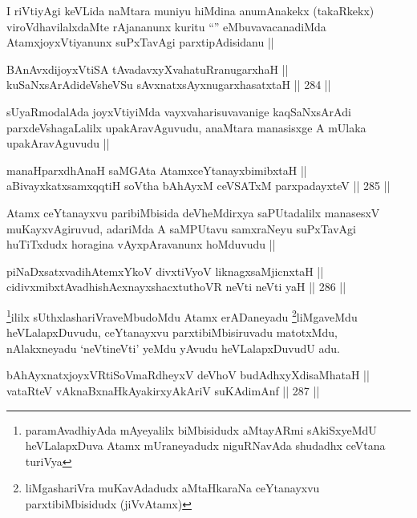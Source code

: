 \begin{artha}
I riVtiyAgi keVLida naMtara muniyu hiMdina anumAnakekx (takaRkekx) viroVdhavilalxdaMte rAjananunx kuritu ``\stext'' eMbuvavacanadiMda AtamxjoyxVtiyanunx suPxTavAgi parxtipAdisidanu ||
\end{artha}


\begin{shl}
BAnAvxdijoyxVtiSA tAvadavxyXvahatuRranugarxhaH || \\
kuSaNxsArAdideVsheVSu sAvxnatxsAyxnugarxhasatxtaH ||  284 ||  
\end{shl}

\begin{artha}
sUyaRmodalAda joyxVtiyiMda vayxvaharisuvavanige kaqSaNxsArAdi parxdeVshagaLalilx upakAravAguvudu, anaMtara manasisxge A mUlaka upakAravAguvudu ||
\end{artha}

\begin{shl}
manaHparxdhAnaH saMGAta AtamxceYtanayxbimibxtaH || \\
aBivayxkatxsamxqqtiH soV\s tha bAhAyxM ceVSATxM parxpadayxteV ||  285 ||  
\end{shl}

\begin{artha}
Atamx ceYtanayxvu paribiMbisida deVheMdirxya saPUtadalilx manasesxV muKayxvAgiruvud, adariMda A saMPUtavu samxraNeyu suPxTavAgi huTiTxdudx horagina vAyxpAravanunx hoMduvudu ||
\end{artha}

\begin{shl}
piNaDxsatxvadihA\s \s temxYkoV divxtiVyoV liknagxsaMjicnxtaH || \\
cidivxmibxtAvadhishAcxnayxshacxtuthoVR neVti neVti yaH ||  286 ||  
\end{shl}

\begin{artha}
\footnote{paramAvadhiyAda mAyeyalilx biMbisidudx aMtayARmi sAkiSxyeMdU heVLalapxDuva Atamx mUraneyadudx niguRNavAda shudadhx  ceVtana turiVya}ililx sUthxlashariVraveMbudoMdu Atamx erADaneyadu \footnote{liMgashariVra muKavAdadudx aMtaHkaraNa ceYtanayxvu parxtibiMbisidudx (jiVvAtamx)}liMgaveMdu heVLalapxDuvudu, ceYtanayxvu parxtibiMbisiruvadu matotxMdu, nAlakxneyadu `neVtineVti' yeMdu yAvudu heVLalapxDuvudU adu.
\end{artha}

\begin{shl}
bAhAyxnatxjoyxVRtiSoVmaRdheyxV deVhoV budAdhxyXdisaMhataH || \\
vataRteV vAknaBxnaHkAyakirxyAkAriV suKAdimAnf ||  287 ||  
\end{shl}


